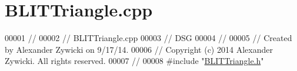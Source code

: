 \hypertarget{_b_l_i_t_triangle_8cpp_source}{\section{B\+L\+I\+T\+Triangle.\+cpp}
\label{_b_l_i_t_triangle_8cpp_source}
}

\begin{DoxyCode}
00001 \textcolor{comment}{//}
00002 \textcolor{comment}{//  BLITTriangle.cpp}
00003 \textcolor{comment}{//  DSG}
00004 \textcolor{comment}{//}
00005 \textcolor{comment}{//  Created by Alexander Zywicki on 9/17/14.}
00006 \textcolor{comment}{//  Copyright (c) 2014 Alexander Zywicki. All rights reserved.}
00007 \textcolor{comment}{//}
00008 \textcolor{preprocessor}{#include "\hyperlink{_b_l_i_t_triangle_8h}{BLITTriangle.h}"}
\end{DoxyCode}
